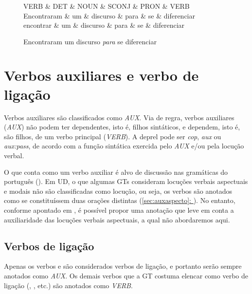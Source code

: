 \documentclass[output=paper,colorlinks,citecolor=brown]{langscibook}
\newcommand*{\fullref}[1]{\hyperref[{#1}]{\autoref*{#1}: \nameref*{#1}}} %
\begin{document}
	\begin{figure}[H]
		\centering
		\vspace{.8cm}
		\begin{dependency}
			\begin{deptext}
				VERB \& DET \& NOUN \& SCONJ \& PRON \& VERB \\
				Encontraram \& um \& discurso \& para \& se \& diferenciar \\
				encontrar \& um \& discurso \& para \& se \& diferenciar \\
			\end{deptext}
		\end{dependency}
		\caption{Encontraram um discurso \emph{para} se diferenciar}\label{dep:classesdinamicas}
	\end{figure}


\section{Verbos auxiliares e verbo de ligação}\label{sec:verbosauxiliares}

	Verbos auxiliares são classificados como \emph{AUX}. Via de regra, verbos auxiliares (\emph{AUX}) não podem ter dependentes, isto é, filhos sintáticos, e dependem, isto é, são filhos, de um verbo principal (\emph{VERB}). A deprel pode ser \emph{cop}, \emph{aux} ou \emph{aux:pass}, de acordo com a função sintática exercida pelo \emph{AUX} e/ou pela locução verbal.

	O que conta como um verbo auxiliar é alvo de discussão nas gramáticas do português (\citet{elvis2019locverbal}). Em UD, o que algumas GTs consideram locuções verbais aspectuais e modais não são classificadas como locução, ou seja, os verbos são anotados como se constituíssem duas orações distintas (\fullref{sec:auxaspecto}). No entanto, conforme apontado em \citet{elvis2019locverbal}, é possível propor uma anotação que leve em conta a auxiliaridade das locuções verbais aspectuais, a qual não abordaremos aqui.

	\subsection{Verbos de ligação}\label{sec:verbosdeligacao}
	
		Apenas os verbos  e  são considerados verbos de ligação, e portanto serão sempre anotados como \textit{AUX}. Os demais verbos que a GT costuma elencar como verbo de ligação (, , etc.) são anotados como \textit{VERB}.
\end{document}
